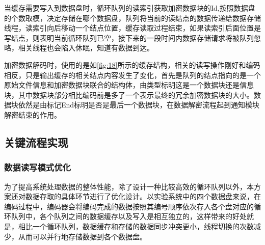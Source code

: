 当缓存需要写入到数据盘时，循环队列的读索引获取加密数据块的Id,按照数据盘的个数取模，决定存储在哪个数据盘，队列将当前的读结点的数据传递给数据存储线程，读索引向后移动一个结点位置，缓存读取过程结束，如果读索引后面位置是写结点，则表明当前循环队列已空，接下来的一段时间内数据存储请求将被队列忽略，相关线程也会陷入休眠，知道有数据到达。


加密数据解码时，使用的是如\autoref{fig:18}所示的缓存结构，相关的读写操作刚好和编码相反，只是输出缓存的相关结点内容发生了变化，首先是队列的结点指向的是一个原始文件信息和加密数据块联合的结构体，由类型标明这是一个数据块还是信息块，其中数据块部分相比编码前是多了一个表示最终的冗余加密数据块的大小。数据块依然是由标记End标明是否是最后一个数据块，在数据解密流程起到通知模块解密结束的作用。
\subsection{关键流程实现}
\subsubsection{数据读写模式优化}
为了提高系统处理数据的整体性能，除了设计一种比较高效的循环队列以外，本方案还对数据存取的具体环节进行了优化设计。以实验系统中的四个数据盘来说，在编码过程中，编码器会将编码完成的数据按照其编号顺序依次存入各个盘对应的循环队列中，各个队列之间的数据缓存以及写入是相互独立的，这样带来的好处就是，相比一个循环队列，数据缓存和存储的数据同步冲突更小，线程切换的次数减少，从而可以并行地存储数据到各个数据盘。


